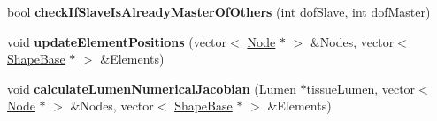 \begin{DoxyCompactItemize}
\item 
\hypertarget{classNewtonRaphsonSolver_ab4dd0fae0f0d56355521fbd22875bda8}{}bool {\bfseries check\+If\+Slave\+Is\+Already\+Master\+Of\+Others} (int dof\+Slave, int dof\+Master)\label{classNewtonRaphsonSolver_ab4dd0fae0f0d56355521fbd22875bda8}

\item 
\hypertarget{classNewtonRaphsonSolver_adc82019981a741147db480366e79a53f}{}void {\bfseries update\+Element\+Positions} (vector$<$ \hyperlink{classNode}{Node} $\ast$ $>$ \&Nodes, vector$<$ \hyperlink{classShapeBase}{Shape\+Base} $\ast$ $>$ \&Elements)\label{classNewtonRaphsonSolver_adc82019981a741147db480366e79a53f}

\item 
\hypertarget{classNewtonRaphsonSolver_ac3e678abdc149db73c340c9afc73f970}{}void {\bfseries calculate\+Lumen\+Numerical\+Jacobian} (\hyperlink{classLumen}{Lumen} $\ast$tissue\+Lumen, vector$<$ \hyperlink{classNode}{Node} $\ast$ $>$ \&Nodes, vector$<$ \hyperlink{classShapeBase}{Shape\+Base} $\ast$ $>$ \&Elements)\label{classNewtonRaphsonSolver_ac3e678abdc149db73c340c9afc73f970}

\end{DoxyCompactItemize}
